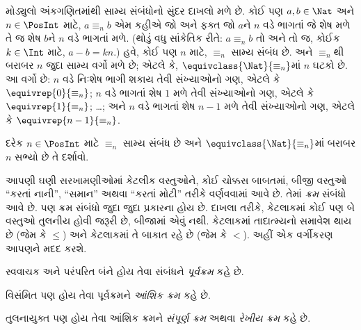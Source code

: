 \begin{ex}
મોડ્યુલો અંકગણિતમાંથી સામ્ય સંબંધોનો સુંદર દાખલો મળે છે.
કોઈ પણ $a,b\in\Nat$ અને $n \in \PosInt$ માટે,
$a \equiv_n b$ એમ કહીએ જો અને ફક્ત જો $a$ને $n$ વડે
ભાગતાં જે શેષ મળે તે જ શેષ $b$ને $n$ વડે ભાગતાં મળે.
(થોડું વધુ સાંકેતિક રીતે: $a \equiv_n b$ તો અને તો જ,
કોઈક $k \in \Int$ માટે, $a - b = kn$.)
હવે, કોઈ પણ $n$ માટે, $\equiv_n$ સામ્ય સંબંધ છે.
અને $\equiv_n$થી બરાબર $n$ જુદા સામ્ય વર્ગો મળે છે;
એટલે કે, $\equivclass{\Nat}{\equiv_n}$માં $n$ ઘટકો છે.
આ વર્ગો છે: $n$ વડે નિઃશેષ ભાગી શકાય તેવી સંખ્યાઓનો ગણ,
એટલે કે $\equivrep{0}{\equiv_n}$; $n$ વડે ભાગતાં
શેષ $1$ મળે તેવી સંખ્યાઓનો ગણ, એટલે કે
$\equivrep{1}{\equiv_n}$; \ldots; અને $n$ વડે ભાગતાં
શેષ $n-1$ મળે તેવી સંખ્યાઓનો ગણ, એટલે કે
$\equivrep{n-1}{\equiv_n}$.
\end{ex}

\begin{prob}
દરેક $n \in \PosInt$ માટે $\equiv_n$ સામ્ય સંબંધ છે અને
$\equivclass{\Nat}{\equiv_n}$માં બરાબર $n$ સભ્યો છે તે દર્શાવો.
\end{prob}
\endgroup


\begingroup
\makeatletter{}\makeatother

\label{guunit:OLP-0016}


\begin{explain}
આપણી ઘણી સરખામણીઓમાં કેટલીક વસ્તુઓને, કોઈ ચોક્કસ બાબતમાં,
બીજી વસ્તુઓ “કરતાં નાની”, “સમાન” અથવા “કરતાં મોટી”
તરીકે વર્ણવવામાં આવે છે. તેમાં \emph{ક્રમ} સંબંધો આવે છે.
પણ ક્રમ સંબંધો જુદા જુદા પ્રકારના હોય છે. દાખલા તરીકે,
કેટલાકમાં કોઈ પણ બે વસ્તુઓ તુલનીય હોવી જરૂરી છે,
બીજામાં એવું નથી. કેટલાકમાં તાદાત્મ્યનો સમાવેશ થાય છે
(જેમ કે $\le$) અને કેટલાકમાં તે બાકાત રહે છે (જેમ કે $<$).
અહીં એક વર્ગીકરણ આપણને મદદ કરશે.
\end{explain}

\begin{defn}[પૂર્વક્રમ]
સ્વવાચક અને પરંપરિત બંને હોય તેવા સંબંધને \emph{પૂર્વક્રમ} કહે છે.
\end{defn}

\begin{defn}[આંશિક ક્રમ]
વિસંમિત પણ હોય તેવા પૂર્વક્રમને \emph{આંશિક ક્રમ} કહે છે.
\end{defn}

\begin{defn}[રેખીય ક્રમ]
તુલનાયુક્ત પણ હોય તેવા આંશિક ક્રમને \emph{સંપૂર્ણ ક્રમ}
અથવા \emph{રેખીય ક્રમ} કહે છે.
\end{defn}

